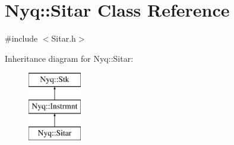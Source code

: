 \hypertarget{class_nyq_1_1_sitar}{}\section{Nyq\+:\+:Sitar Class Reference}
\label{class_nyq_1_1_sitar}


{\ttfamily \#include $<$Sitar.\+h$>$}

Inheritance diagram for Nyq\+:\+:Sitar\+:\begin{figure}[H]
\begin{center}
\leavevmode
\includegraphics[height=3.000000cm]{class_nyq_1_1_sitar}
\end{center}
\end{figure}
